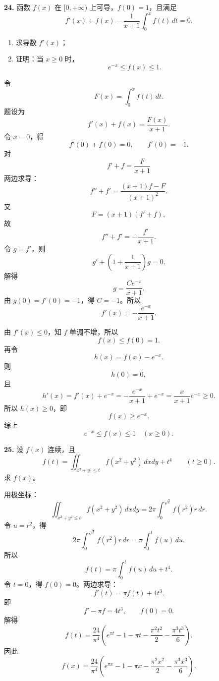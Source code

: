 \begin{problemblock}
\textbf{24.} 函数 \(f(x)\) 在 \([0,+\infty)\) 上可导，\(f(0)=1\)，且满足
\[
f'(x)+f(x)-\frac{1}{x+1}\int_0^x f(t)\,dt=0.
\]
\begin{enumerate}
\item 求导数 \(f'(x)\)；
\item 证明：当 \(x\ge0\) 时，
\[
e^{-x}\le f(x)\le1.
\]
\end{enumerate}
\end{problemblock}

\begin{solutionblock}
令
\[
F(x)=\int_0^xf(t)\,dt.
\]
题设为
\[
f'(x)+f(x)=\frac{F(x)}{x+1}.
\]
令 \(x=0\)，得
\[
f'(0)+f(0)=0,\qquad f'(0)=-1.
\]
对
\[
f'+f=\frac{F}{x+1}
\]
两边求导：
\[
f''+f'=\frac{(x+1)f-F}{(x+1)^2}.
\]
又
\[
F=(x+1)(f'+f),
\]
故
\[
f''+f'=-\frac{f'}{x+1}.
\]
令 \(g=f'\)，则
\[
g'+\left(1+\frac{1}{x+1}\right)g=0.
\]
解得
\[
g=\frac{Ce^{-x}}{x+1}.
\]
由 \(g(0)=f'(0)=-1\)，得 \(C=-1\)。所以
\[
\boxed{f'(x)=-\frac{e^{-x}}{x+1}}.
\]

由 \(f'(x)\le0\)，知 \(f\) 单调不增，所以
\[
f(x)\le f(0)=1.
\]
再令
\[
h(x)=f(x)-e^{-x}.
\]
则
\[
h(0)=0,
\]
且
\[
h'(x)=f'(x)+e^{-x}
=-\frac{e^{-x}}{x+1}+e^{-x}
=\frac{x}{x+1}e^{-x}\ge0.
\]
所以 \(h(x)\ge0\)，即
\[
f(x)\ge e^{-x}.
\]
综上
\[
\boxed{e^{-x}\le f(x)\le1\quad(x\ge0)}.
\]
\end{solutionblock}

\begin{problemblock}
\textbf{25.} 设 \(f(x)\) 连续，且
\[
f(t)=\iint_{x^2+y^2\le t} f(x^2+y^2)\,dxdy+t^4\qquad(t\ge0).
\]
求 \(f(x)\)。
\end{problemblock}

\begin{solutionblock}
用极坐标：
\[
\iint_{x^2+y^2\le t} f(x^2+y^2)\,dxdy
=2\pi\int_0^{\sqrt t}f(r^2)r\,dr.
\]
令 \(u=r^2\)，得
\[
2\pi\int_0^{\sqrt t}f(r^2)r\,dr
=\pi\int_0^t f(u)\,du.
\]
所以
\[
f(t)=\pi\int_0^t f(u)\,du+t^4.
\]
令 \(t=0\)，得 \(f(0)=0\)。两边求导：
\[
f'(t)=\pi f(t)+4t^3.
\]
即
\[
f'-\pi f=4t^3,\qquad f(0)=0.
\]
解得
\[
f(t)=\frac{24}{\pi^4}\left(e^{\pi t}-1-\pi t-\frac{\pi^2t^2}{2}-\frac{\pi^3t^3}{6}\right).
\]
因此
\[
\boxed{
f(x)=\frac{24}{\pi^4}\left(e^{\pi x}-1-\pi x-\frac{\pi^2x^2}{2}-\frac{\pi^3x^3}{6}\right)}.
\]
\end{solutionblock}

